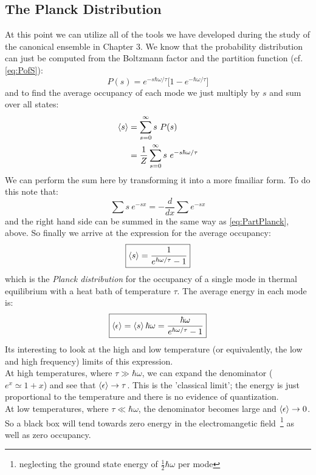\subsection{The Planck Distribution}
At this point we can utilize all of the tools we have developed during the study of the canonical ensemble in Chapter 3. We know that the probability 
distribution can just be computed from the Boltzmann factor and the partition 
function (cf.\,\cref{eq:PofS}):
\begin{equation}
P(s) = e^{-s \hbar \omega / \tau} \bigg[ 1 - e^{-\hbar \omega / \tau} \bigg]
\end{equation}
and to find the average occupancy of each mode we just multiply by $s$ and sum over all states:
\begin{align}
\Braket{s} &= \sum_{s=0}^{\infty} s~P(s) \\
           &= \frac{1}{Z} \sum_{s=0}^{\infty} s~e^{-s \hbar \omega / \tau}
\end{align}
We can perform the sum here by transforming it into a more fmailiar form. To do this note that:
\begin{equation}
\sum s~e^{-s x} = -\frac{d}{dx} \sum e^{-s x}
\end{equation}
and the right hand side can be summed in the same way as \cref{eq:PartPlanck}, above.
So finally we arrive at the expression for the average occupancy:
\begin{equation}
\boxed{\Braket{s} = \frac{1}{e^{\hbar \omega / \tau} - 1}}
\end{equation}
which is the \emph{Planck distribution} for the occupancy of a single mode in thermal equilibrium with a heat bath of temperature $\tau$. The average energy in each mode is:
\begin{equation}
\boxed{\Braket{\epsilon} = \Braket{s} \hbar \omega= 
\frac{\hbar \omega}{e^{\hbar \omega / \tau} - 1}}
\end{equation}
Its interesting to look at the high and low temperature (or equivalently, the low and high frequency) limits of this expression. \\

At high temperatures, where 
$\tau \gg \hbar \omega$, we can expand the denominator ($e^x \simeq 1 + x$) and see
that $\Braket{\epsilon} \to \tau$. This is the 'classical limit'; the energy is just
proportional to the temperature and there is no evidence of quantization.\\

At low temperatures, where $\tau \ll \hbar \omega$, the denominator becomes large
and $\Braket{\epsilon} \to 0$. So a black box will tend towards zero energy in the
electromangetic field~\footnote{neglecting the ground state energy of 
$\frac{1}{2}\hbar \omega$ per mode} as well as zero occupancy. \\


